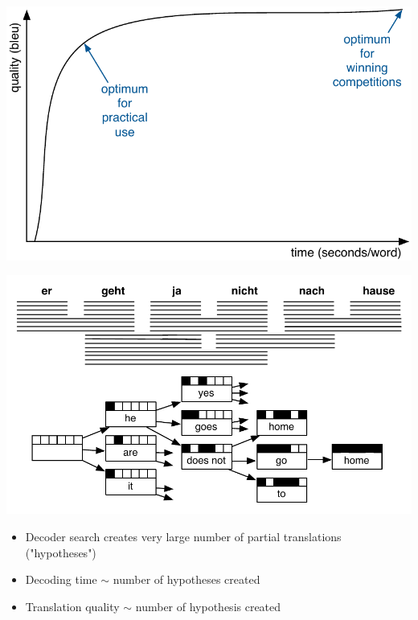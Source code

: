 \documentclass[landscape]{uedslides2C}
\begin{document}
\vspace{5mm}
\begin{center} 
\includegraphics[scale=1.4]{quality-vs-speed.pdf}\vspace{-20mm}
\end{center}


\begin{center} 
\includegraphics[scale=0.95]{decoding-step5.pdf}
\end{center}
\begin{itemize} \itemsep -1mm
\item Decoder search creates very large number of partial translations ("hypotheses")
\item Decoding time $\sim$ number of hypotheses created
\item Translation quality $\sim$ number of hypothesis created
\end{itemize}
\end{document}
